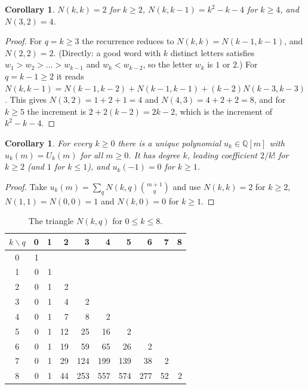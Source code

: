 \documentclass[11pt]{amsart}
\newtheorem{corollary}[theorem]{Corollary}
\theoremstyle{definition}
\newcommand{\Q}{\mathbb{Q}}
\begin{document}
\begin{corollary}\label{cor:diag}
$N(k,k)=2$ for $k\ge2$, $N(k,k-1)=k^2-k-4$ for $k\ge4$, and $N(3,2)=4$.
\end{corollary}

\begin{proof}
For $q=k\ge3$ the recurrence reduces to $N(k,k)=N(k-1,k-1)$, and $N(2,2)=2$. (Directly: a good word with $k$ distinct letters satisfies $w_1>w_2>\dots>w_{k-1}$ and $w_k<w_{k-2}$, so the letter $w_k$ is $1$ or $2$.) For $q=k-1\ge2$ it reads $N(k,k-1)=N(k-1,k-2)+N(k-1,k-1)+(k-2)N(k-3,k-3)$. This gives $N(3,2)=1+2+1=4$ and $N(4,3)=4+2+2=8$, and for $k\ge5$ the increment is $2+2(k-2)=2k-2$, which is the increment of $k^2-k-4$.
\end{proof}

\begin{corollary}\label{cor:poly}
For every $k\ge0$ there is a unique polynomial $u_k\in\Q[m]$ with $u_k(m)=U_k(m)$ for all $m\ge0$. It has degree $k$, leading coefficient $2/k!$ for $k\ge2$ (and $1$ for $k\le1$), and $u_k(-1)=0$ for $k\ge1$.
\end{corollary}

\begin{proof}
Take $u_k(m)=\sum_qN(k,q)\binom{m+1}{q}$ and use $N(k,k)=2$ for $k\ge2$, $N(1,1)=N(0,0)=1$ and $N(k,0)=0$ for $k\ge1$.
\end{proof}

\begin{table}[ht]
\centering
\begin{tabular}{c|rrrrrrrrr}
\toprule
$k\backslash q$ & 0 & 1 & 2 & 3 & 4 & 5 & 6 & 7 & 8\\
\midrule
0 & 1 &  &  &  &  &  &  &  &  \\
1 & 0 & 1 &  &  &  &  &  &  &  \\
2 & 0 & 1 & 2 &  &  &  &  &  &  \\
3 & 0 & 1 & 4 & 2 &  &  &  &  &  \\
4 & 0 & 1 & 7 & 8 & 2 &  &  &  &  \\
5 & 0 & 1 & 12 & 25 & 16 & 2 &  &  &  \\
6 & 0 & 1 & 19 & 59 & 65 & 26 & 2 &  &  \\
7 & 0 & 1 & 29 & 124 & 199 & 139 & 38 & 2 &  \\
8 & 0 & 1 & 44 & 253 & 557 & 574 & 277 & 52 & 2 \\
\bottomrule
\end{tabular}
\caption{The triangle $N(k,q)$ for $0\le k\le8$.}\label{tab:N}
\end{table}
\end{document}

